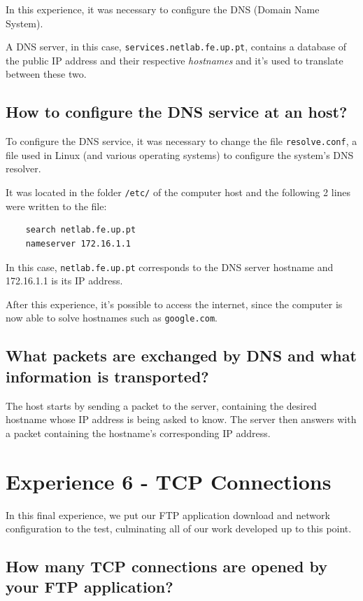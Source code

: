 \documentclass[11pt]{report}
\begin{document}
In this experience, it was necessary to configure the DNS (Domain Name System).

A DNS server, in this case, \texttt{services.netlab.fe.up.pt}, contains a database of the public IP address and their respective \textit{hostnames} and it's used to translate between these two.

\subsection{How to configure the DNS service at an host?}

To configure the DNS service, it was necessary to change the file \texttt{resolve.conf}, a file used in Linux (and various operating systems) to configure the system's DNS resolver.

It was located in the folder \texttt{/etc/} of the computer host and the following 2 lines were written to the file:

\begin{verbatim}
    search netlab.fe.up.pt 
    nameserver 172.16.1.1
\end{verbatim}

In this case, \texttt{netlab.fe.up.pt} corresponds to the DNS server hostname and 172.16.1.1 is its IP address.

After this experience, it's possible to access the internet, since the computer is now able to solve hostnames such as \texttt{google.com}.

\subsection{What packets are exchanged by DNS and what information is transported?}

The host starts by sending a packet to the server, containing the desired hostname whose IP address is being asked to know.
The server then answers with a packet containing the hostname's corresponding IP address.

\newpage

\section{Experience 6 - TCP Connections}

In this final experience, we put our FTP application download and network configuration to the test, culminating all of our work developed up to this point.

\subsection{How many TCP connections are opened by your FTP application?}
\end{document}
